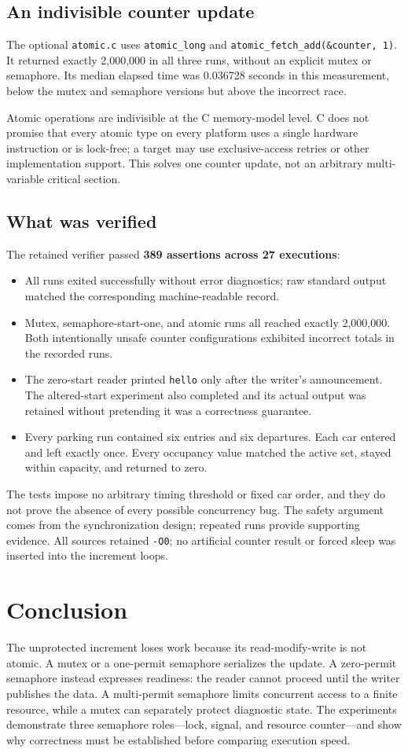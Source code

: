 \documentclass[12pt]{article}
\begin{document}
\subsection{An indivisible counter update}
The optional \texttt{atomic.c} uses \texttt{atomic\_long} and
\texttt{atomic\_fetch\_add(\&counter, 1)}. It returned exactly 2,000,000 in
all three runs, without an explicit mutex or semaphore. Its median elapsed
time was 0.036728 seconds in this measurement, below the mutex and semaphore
versions but above the incorrect race.

Atomic operations are indivisible at the C memory-model level. C does not
promise that every atomic type on every platform uses a single hardware
instruction or is lock-free; a target may use exclusive-access retries or
other implementation support. This solves one counter update, not an
arbitrary multi-variable critical section.

\subsection{What was verified}
The retained verifier passed \textbf{389 assertions across 27 executions}:
\begin{itemize}
\item All runs exited successfully without error diagnostics; raw standard
output matched the corresponding machine-readable record.
\item Mutex, semaphore-start-one, and atomic runs all reached exactly
2,000,000. Both intentionally unsafe counter configurations exhibited
incorrect totals in the recorded runs.
\item The zero-start reader printed \texttt{hello} only after the writer's
announcement. The altered-start experiment also completed and its actual
output was retained without pretending it was a correctness guarantee.
\item Every parking run contained six entries and six departures. Each car
entered and left exactly once. Every occupancy value matched the active
set, stayed within capacity, and returned to zero.
\end{itemize}
The tests impose no arbitrary timing threshold or fixed car order, and they
do not prove the absence of every possible concurrency bug. The safety
argument comes from the synchronization design; repeated runs provide
supporting evidence. All sources retained \texttt{-O0}; no artificial
counter result or forced sleep was inserted into the increment loops.

\section{Conclusion}
The unprotected increment loses work because its read-modify-write is not
atomic. A mutex or a one-permit semaphore serializes the update. A
zero-permit semaphore instead expresses readiness: the reader cannot
proceed until the writer publishes the data. A multi-permit semaphore
limits concurrent access to a finite resource, while a mutex can separately
protect diagnostic state. The experiments demonstrate three semaphore
roles---lock, signal, and resource counter---and show why correctness must
be established before comparing execution speed.
\end{document}
